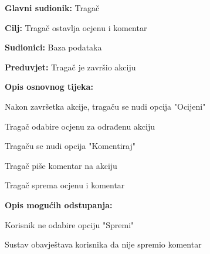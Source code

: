 				\noindent {}
				\begin{packed_item}
					
					\item \textbf{Glavni sudionik: }Tragač
					\item  \textbf{Cilj:} Tragač ostavlja ocjenu i komentar
					\item  \textbf{Sudionici:} Baza podataka
					\item  \textbf{Preduvjet:} Tragač je završio akciju
					\item  \textbf{Opis osnovnog tijeka:}
					
					\item[] \begin{packed_enum}
						
						\item Nakon završetka akcije, tragaču se nudi opcija "Ocijeni"
						\item Tragač odabire ocjenu za odrađenu akciju
						\item Tragaču se nudi opcija "Komentiraj"
						\item Tragač piše komentar na akciju
						\item Tragač sprema ocjenu i komentar
						
					\end{packed_enum}
					
						\item  \textbf{Opis mogućih odstupanja:}
					
					\item[] \begin{packed_item}
						
						\item[4.a]Korisnik ne odabire opciju "Spremi"
						\item[] \begin{packed_enum}
							
							\item Sustav obavještava korisnika da nije spremio komentar
							
						\end{packed_enum}
						
					\end{packed_item}
				\end{packed_item}
				

					
				
